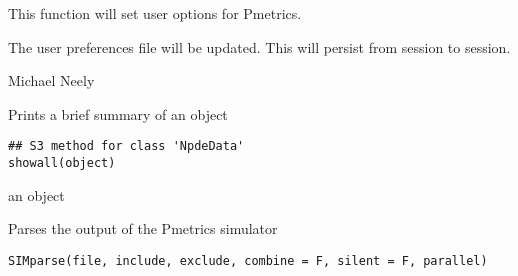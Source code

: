 \documentclass[a4paper]{book}
\begin{document}
%
\begin{Details}\relax
This function will set user options for Pmetrics.
\end{Details}
%
\begin{Value}
The user preferences file will be updated.  This will persist from session to session.
\end{Value}
%
\begin{Author}\relax
Michael Neely
\end{Author}
%
\begin{Description}\relax
Prints a brief summary of an object
\end{Description}
%
\begin{Usage}
\begin{verbatim}
## S3 method for class 'NpdeData'
showall(object)
\end{verbatim}
\end{Usage}
%
\begin{Arguments}
\begin{ldescription}
\item[\code{object}] an object
\end{ldescription}
\end{Arguments}
%
\begin{Description}\relax
Parses the output of the Pmetrics simulator
\end{Description}
%
\begin{Usage}
\begin{verbatim}
SIMparse(file, include, exclude, combine = F, silent = F, parallel)
\end{verbatim}
\end{Usage}
%
\end{document}
